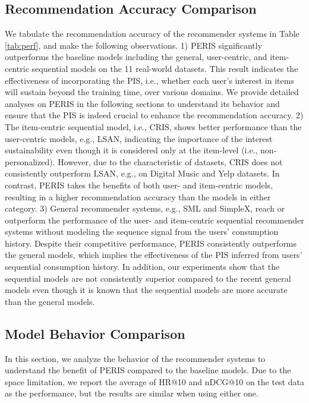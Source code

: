 \documentclass[sigconf]{acmart}
\newcommand{\MD}{{\small\textsf{PERIS}}}
\begin{document}
\subsection{Recommendation Accuracy Comparison}
We tabulate the recommendation accuracy of the recommender systems in Table \ref{tab:perf}, and make the following observations. 1)
\MD{} significantly outperforms the baseline models including the general, user-centric, and item-centric sequential models on the 11 real-world datasets. This result indicates the effectiveness of incorporating the PIS, i.e., whether each user's interest in items will sustain beyond the training time, over various domains. 
We provide detailed analyses on \MD{} in the following sections to understand its behavior and ensure that the PIS is indeed crucial to enhance the recommendation accuracy.
2) The item-centric sequential model, i.e., CRIS, shows better performance than the user-centric models, e.g., LSAN, indicating the importance of the interest sustainability even though it is considered only at the item-level (i.e., non-personalized).
However, due to the characteristic of datasets, CRIS does not consistently outperform LSAN, e.g., on Digital Music and Yelp datasets. In contrast, \MD{} takes the benefits of both user- and item-centric models, resulting in a higher recommendation accuracy than the models in either category. 
3) General recommender systems, e.g., SML and SimpleX, reach or outperform the performance of the user- and item-centric sequential recommender systems without modeling the sequence signal from the users' consumption history. Despite their competitive performance, \MD{} consistently outperforms the general models, which implies the effectiveness of the PIS inferred from users' sequential consumption history.
In addition, our experiments show that the sequential models are not consistently superior compared to the recent general models even though it is known that the sequential models are more accurate than the general models. 






\subsection{Model Behavior Comparison}
In this section, we analyze the behavior of the recommender systems to understand the benefit of \MD{} compared to the baseline models. Due to the space limitation, we report the average of HR@10 and nDCG@10 on the test data as the performance, but the results are similar when using either one. 
\end{document}
